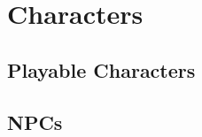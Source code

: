 \section{Characters}
    \subsection{Playable Characters}
        
        
        
        
    \subsection{NPCs}
        
        
        
        